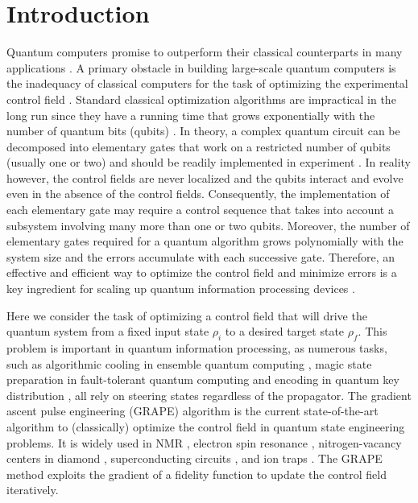\documentclass[twocolumn,reprint, amsmath,amssymb,showpacs,superscriptaddress]{revtex4-1}
\begin{document}
\section{Introduction}

Quantum computers promise to outperform their classical counterparts in many applications \cite{shor1994algorithms,grover1996fast,farhi2001quantum,buluta2009quantum,georgescu2014quantum,harrow2009quantum}.  A primary obstacle in building large-scale quantum computers is the inadequacy of classical computers for the task of optimizing the experimental control field \cite{ladd2010quantum}.  Standard classical optimization algorithms are impractical in the long run since they have a running time that grows exponentially with the number of quantum bits (qubits) \cite{gradl2006parallelising}. In theory, a complex quantum circuit can be decomposed into  elementary gates that work on a restricted number of qubits (usually one or two) and should be readily implemented in experiment \cite{nielsen2010quantum}. In reality however, the control fields are never localized and the qubits interact and evolve  even in the absence of the control  fields. Consequently, the implementation of each elementary gate may require a control sequence that takes into account a subsystem involving many more than one or two qubits. Moreover, the number of elementary gates required for a quantum algorithm grows polynomially with the system size and the errors accumulate with each successive gate. Therefore, an effective and efficient way to optimize the control field and minimize errors is a key ingredient for scaling up quantum information processing devices \cite{brif2010control}.

Here we consider the task of optimizing a control field that will drive the  quantum system from a fixed input state $\rho_i$ to a desired target state $\rho_f$. This problem is important in quantum information processing, as numerous tasks, such as algorithmic cooling in ensemble quantum computing \cite{boykin2002algorithmic,baugh2005experimental}, magic state preparation in fault-tolerant quantum computing \cite{souza2011experimental} and encoding in quantum key distribution \cite{bennett1984quantum}, all rely on steering states regardless of the propagator. The gradient ascent pulse engineering (GRAPE) algorithm \cite{khaneja2005optimal} is the current state-of-the-art algorithm to  (classically) optimize the control field in quantum state engineering problems. It is  widely used in NMR \cite{ryan2008liquid}, electron spin resonance \cite{zhang2011coherent}, nitrogen-vacancy centers in diamond \cite{waldherr2014quantum,dolde2014high}, superconducting circuits \cite{motzoi2009simple,egger2013optimized}, and ion traps \cite{nebendahl2009optimal,schindler2011experimental}. The GRAPE method exploits the gradient of a fidelity function to update the control field iteratively.
\end{document}
